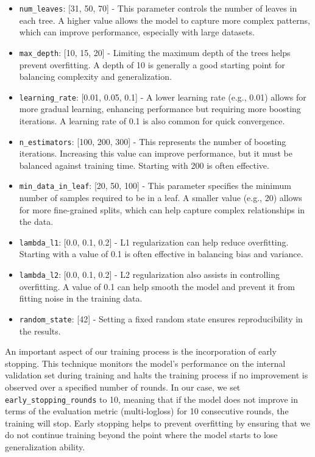 \documentclass[a4paper,11pt]{article}
\begin{document}
\begin{itemize}
    \item \texttt{num\_leaves}: [31, 50, 70] - This parameter controls the number of leaves in each tree. A higher value allows the model to capture more complex patterns, which can improve performance, especially with large datasets.
    
    \item \texttt{max\_depth}: [10, 15, 20] - Limiting the maximum depth of the trees helps prevent overfitting. A depth of 10 is generally a good starting point for balancing complexity and generalization.
    
    \item \texttt{learning\_rate}: [0.01, 0.05, 0.1] - A lower learning rate (e.g., 0.01) allows for more gradual learning, enhancing performance but requiring more boosting iterations. A learning rate of 0.1 is also common for quick convergence.
    
    \item \texttt{n\_estimators}: [100, 200, 300] - This represents the number of boosting iterations. Increasing this value can improve performance, but it must be balanced against training time. Starting with 200 is often effective.
    
    \item \texttt{min\_data\_in\_leaf}: [20, 50, 100] - This parameter specifies the minimum number of samples required to be in a leaf. A smaller value (e.g., 20) allows for more fine-grained splits, which can help capture complex relationships in the data.
    
    \item \texttt{lambda\_l1}: [0.0, 0.1, 0.2] - L1 regularization can help reduce overfitting. Starting with a value of 0.1 is often effective in balancing bias and variance.
    
    \item \texttt{lambda\_l2}: [0.0, 0.1, 0.2] - L2 regularization also assists in controlling overfitting. A value of 0.1 can help smooth the model and prevent it from fitting noise in the training data.
    
    \item \texttt{random\_state}: [42] - Setting a fixed random state ensures reproducibility in the results.
\end{itemize}

An important aspect of our training process is the incorporation of early stopping. This technique monitors the model's performance on the internal validation set during training and halts the training process if no improvement is observed over a specified number of rounds. In our case, we set \texttt{early\_stopping\_rounds} to 10, meaning that if the model does not improve in terms of the evaluation metric (multi-logloss) for 10 consecutive rounds, the training will stop. Early stopping helps to prevent overfitting by ensuring that we do not continue training beyond the point where the model starts to lose generalization ability.
\end{document}
